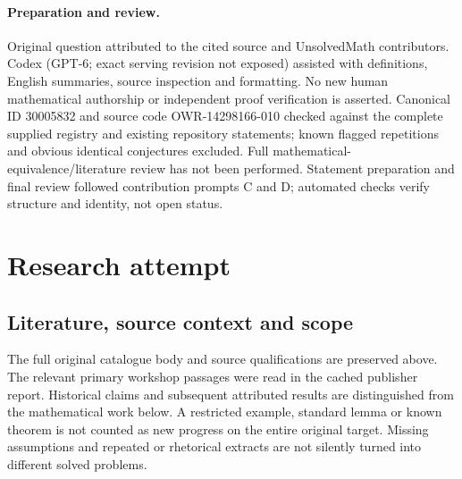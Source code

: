 \documentclass[11pt]{article}
\begin{document}
\paragraph{Preparation and review.}
Original question attributed to the cited source and UnsolvedMath contributors. Codex (GPT-6; exact serving revision not exposed) assisted with definitions, English summaries, source inspection and formatting. No new human mathematical authorship or independent proof verification is asserted. Canonical ID 30005832 and source code OWR-14298166-010 checked against the complete supplied registry and existing repository statements; known flagged repetitions and obvious identical conjectures excluded. Full mathematical-equivalence/literature review has not been performed. Statement preparation and final review followed contribution prompts C and D; automated checks verify structure and identity, not open status.
\label{end:30005832}

\section{Research attempt}
\subsection{Literature, source context and scope}
The full original catalogue body and source qualifications are preserved above. The relevant primary workshop passages were read in the cached publisher report. Historical claims and subsequent attributed results are distinguished from the mathematical work below. A restricted example, standard lemma or known theorem is not counted as new progress on the entire original target. Missing assumptions and repeated or rhetorical extracts are not silently turned into different solved problems.
\end{document}
